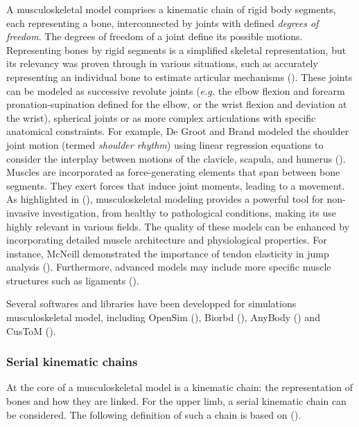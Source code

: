 A musculoskeletal model comprises a kinematic chain of rigid body segments, each representing a bone, interconnected by joints with defined \emph{degrees of freedom}. The degrees of freedom of a joint define its possible motions. Representing bones by rigid segments is a simplified skeletal representation, but its relevancy was proven through in various situations, such as accurately representing an individual bone to estimate articular mechanisms (\cite{suwargandaMinimalMedicalImaging2019}). These joints can be modeled as successive revolute joints (\emph{e.g.} the elbow flexion and forearm pronation-supination defined for the elbow, or the wrist flexion and deviation at the wrist), spherical joints or as more complex articulations with specific anatomical constraints. For example, De Groot and Brand modeled the shoulder joint motion (termed \emph{shoulder rhythm}) using linear regression equations to consider the interplay between motions of the clavicle, scapula, and humerus (\cite{degrootThreedimensionalRegressionModel2001}). Muscles are incorporated as force-generating elements that span between bone segments. They exert forces that induce joint moments, leading to a movement. As highlighted in (\cite{bassaniChapter15Musculoskeletal2018}), musculoskeletal modeling provides a powerful tool for non-invasive investigation, from healthy to pathological conditions, making its use highly relevant in various fields. The quality of these models can be enhanced by incorporating detailed muscle architecture and physiological properties. For instance, McNeill demonstrated the importance of tendon elasticity in jump analysis (\cite{mcneillalexanderTendonElasticityMuscle2002}). Furthermore, advanced models may include more specific muscle structures such as ligaments (\cite{shelburneMusculoskeletalModelKnee1997}).

Several softwares and libraries have been developped for simulations musculoskeletal model, including OpenSim (\cite{delpInteractiveGraphicsbasedModel1990a}), Biorbd (\cite{michaudBiorbdPythonMATLAB2021}), AnyBody (\cite{damsgaardAnalysisMusculoskeletalSystems2006}) and CusToM (\cite{mullerCusToMMatlabToolbox2019}).

\subsubsection*{Serial kinematic chains}
At the core of a musculoskeletal model is a kinematic chain: the representation of bones and how they are linked. For the upper limb, a serial kinematic chain can be considered. The following definition of such a chain is based on (\cite{lauGeneralizedModelingMultilink2013}).

